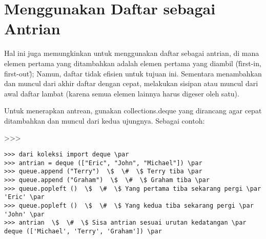 \section{Menggunakan Daftar sebagai Antrian} \par
\vspace{12pt}
Hal ini juga memungkinkan untuk menggunakan daftar sebagai antrian, di mana elemen pertama yang ditambahkan adalah elemen pertama yang diambil (\"first-in, first-out\"); Namun, daftar tidak efisien untuk tujuan ini. Sementara menambahkan dan muncul dari akhir daftar dengan cepat, melakukan sisipan atau muncul dari awal daftar lambat (karena semua elemen lainnya harus digeser oleh satu). \par
\vspace{12pt}
Untuk menerapkan antrean, gunakan collections.deque yang dirancang agar cepat ditambahkan dan muncul dari kedua ujungnya. Sebagai contoh: \par
>>> \par
\vspace{12pt}
\begin{verbatim}
>>> dari koleksi import deque \par
>>> antrian = deque (["Eric", "John", "Michael"]) \par
>>> queue.append ("Terry")  \$  \#  \$ Terry tiba \par
>>> queue.append ("Graham")  \$  \#  \$ Graham tiba \par
>>> queue.popleft ()  \$  \#  \$ Yang pertama tiba sekarang pergi \par
'Eric' \par
>>> queue.popleft ()  \$  \#  \$ Yang kedua tiba sekarang pergi \par
'John' \par
>>> antrian  \$  \#  \$ Sisa antrian sesuai urutan kedatangan \par
deque (['Michael', 'Terry', 'Graham']) \par
\end{verbatim}

